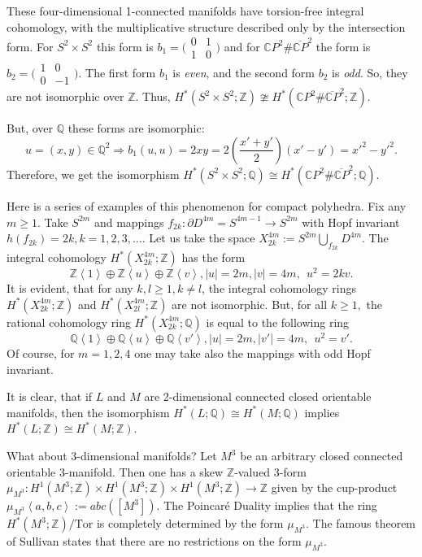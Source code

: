\documentclass[a4paper,14pt]{article}
\newcommand{\Tor}{\mathrm{Tor}}
\newcommand{\Q}{\mathbb{Q}}
\newcommand{\Z}{\mathbb{Z}}
\newcommand{\Cn}{\mathbb{C}}
\begin{document}
These four-dimensional 1-connected manifolds have torsion-free integral cohomology, with the multiplicative structure described only by the intersection form. For $S^2\times S^2$ this form is $b_1=\bigl(\begin{smallmatrix}
0& 1\\ 1& 0
\end{smallmatrix}\bigr)$ and for $\Cn P^2 \# \overline{\Cn P}^2$ the form is $b_2=\bigl(\begin{smallmatrix}
1& 0\\ 0& -1
\end{smallmatrix}\bigr)$. The first form $b_1$ is {\it even}, and the second form $b_2$ is {\it odd}. So, they are not isomorphic over $\Z$. Thus, $H^*(S^2\times S^2;\Z)\ncong  H^*(\Cn P^2 \# \overline{\Cn P}^2;\Z)$.

\noindent But, over $\Q$ these forms are isomorphic: 
$$
u=(x,y)\in \Q^2 \Rightarrow b_1(u,u)=2xy=2(\frac{x'+y'}{2})(x'-y')= x'^2 - y'^2.
$$ 
Therefore, we get the isomorphism $H^*(S^2\times S^2;\Q)\cong  H^*(\Cn P^2 \# \overline{\Cn P}^2;\Q)$.  

Here is a series of examples of this phenomenon for compact polyhedra. Fix any $m\ge 1$. Take $S^{2m}$ and mappings $f_{2k}\colon \partial D^{4m} = S^{4m-1} \to S^{2m}$ with Hopf invariant $h(f_{2k}) = 2k, k=1,2,3,\ldots$. Let us take the space $X_{2k}^{4m}:= S^{2m}\bigcup_{f_{2k}} D^{4m}$. The integral cohomology $H^*(X_{2k}^{4m};\Z)$ has the form 
$$
\Z\left<1\right> \oplus \Z \left< u \right>  \oplus \Z \left< v \right>, |u|=2m, |v|=4m, \ \ u^2 = 2kv.
$$
It is evident, that for any $k,l\ge 1, k\neq l$, the integral cohomology rings $H^*(X_{2k}^{4m};\Z)$ and $H^*(X_{2l}^{4m};\Z)$ are not isomorphic. But, for all $k\ge 1,$ the rational cohomology ring $H^*(X_{2k}^{4m};\Q)$ is equal to the following ring 
$$
\Q\left<1\right> \oplus \Q \left< u \right>  \oplus \Q \left< v' \right>, |u|=2m, |v'|=4m, \ \ u^2 = v'.
$$
Of course, for $m=1,2,4$ one may take also the mappings with odd Hopf invariant. 

It is clear, that if $L$ and $M$ are 2-dimensional connected closed orientable manifolds, then the isomorphism $H^*(L;\Q)\cong H^*(M;\Q)$ implies $H^*(L;\Z)\cong H^*(M;\Z)$. 

What about 3-dimensional manifolds? Let $M^3$ be an arbitrary closed connected orientable 3-manifold. Then one has a skew $\Z$-valued 3-form $\mu_{M^3}\colon H^1(M^3;\Z)\times H^1(M^3;\Z) \times H^1(M^3;\Z) \to \Z$ given by the cup-product $\mu_{M^3}\left<a,b,c\right> := abc([M^3])$. The Poincar\'e Duality implies that the ring $H^*(M^3;\Z)/\Tor$ is completely determined by the form $\mu_{M^3}$. The famous theorem of Sullivan \cite{Sul} states that there are no restrictions on the form $\mu_{M^3}$.
\end{document}

